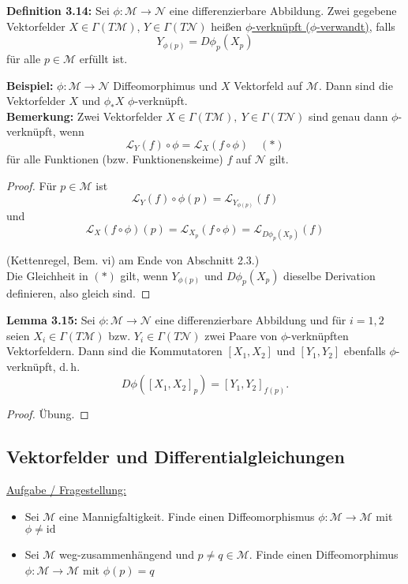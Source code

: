 \documentclass[fleqn, 12pt, letterpaper]{article}
\begin{document}
\textbf{Definition 3.14:}  
Sei \(\phi: \mathcal{M} \to \mathcal{N}\) eine differenzierbare Abbildung. Zwei gegebene Vektorfelder \(X \in \Gamma(T\mathcal{M})\), \(Y \in \Gamma(T\mathcal{N})\)
heißen \underline{\(\phi\)-verknüpft ($\phi$-verwandt)}, falls
\[
Y_{\phi(p)} = D\phi_p(X_p)
\]
für alle \(p \in \mathcal{M}\) erfüllt ist.

\vspace{0.3cm}

\textbf{Beispiel:}  
\(\phi: \mathcal{M} \to \mathcal{N}\) Diffeomorphimus und \(X\) Vektorfeld auf \(\mathcal{M}\).  
Dann sind die Vektorfelder \(X\) und \(\phi_* X\)  
\(\phi\)-verknüpft.\\

\textbf{Bemerkung:}  
Zwei Vektorfelder \(X \in \Gamma(T\mathcal{M}),\ Y \in \Gamma(T\mathcal{N})\) sind genau dann \(\phi\)-verknüpft, wenn
\[
\mathcal{L}_Y(f) \circ \phi = \mathcal{L}_X(f \circ \phi) \quad (*)
\]
für alle Funktionen (bzw. Funktionenskeime) \(f\) auf \(\mathcal{N}\) gilt.
\begin{proof}
    Für \(p \in \mathcal{M}\) ist
\[
\mathcal{L}_Y(f) \circ \phi(p) = \mathcal{L}_{Y_{\phi(p)}}(f)
\]
und
\[
\mathcal{L}_X(f \circ \phi)(p) = \mathcal{L}_{X_p}(f \circ \phi) = \mathcal{L}_{D\phi_p(X_p)}(f)
\]

(Kettenregel, Bem. vi) am Ende von Abschnitt 2.3.)\\

Die Gleichheit in \((*)\) gilt, wenn \(Y_{\phi(p)}\) und \(D\phi_p(X_p)\) dieselbe Derivation definieren, also gleich sind.
\end{proof}


\textbf{Lemma 3.15:}  
Sei \(\phi: \mathcal{M} \to \mathcal{N}\) eine differenzierbare Abbildung und für \(i = 1, 2\) seien \(X_i \in \Gamma(T\mathcal{M})\) bzw. \(Y_i \in \Gamma(T\mathcal{N})\) zwei Paare von $\phi$-verknüpften Vektorfeldern.  
Dann sind die Kommutatoren \([X_1, X_2]\) und \([Y_1, Y_2]\) ebenfalls $\phi$-verknüpft, d.\,h.
\[
D\phi\left([X_1, X_2]_p\right) = \left[ Y_1, Y_2 \right]_{f(p)}.
\]
\begin{proof}
    Übung.
\end{proof}

\subsection{Vektorfelder und Differentialgleichungen}

\underline{Aufgabe / Fragestellung:}  
\begin{itemize}
  \item Sei \(\mathcal{M}\) eine Mannigfaltigkeit. Finde einen Diffeomorphismus \(\phi: \mathcal{M} \to \mathcal{M}\) mit $\phi\neq \mathrm{id}$
  \item Sei \(\mathcal{M}\) weg-zusammenhängend und \(p \neq q \in \mathcal{M}\). Finde einen Diffeomorphimus \(\phi: \mathcal{M} \to \mathcal{M}\) mit \(\phi(p) = q\)
\end{itemize}
\end{document}

